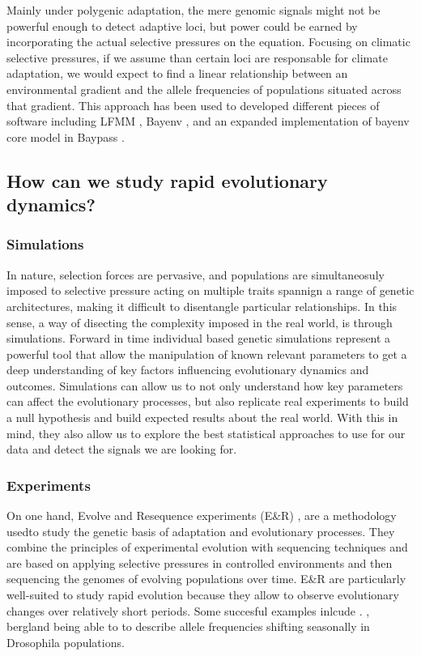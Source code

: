 \documentclass{article}
\begin{document}
Mainly under polygenic adaptation, the mere genomic signals might not be powerful enough to detect adaptive loci, but power could be earned by incorporating the actual selective pressures on the equation. Focusing on climatic selective pressures, if we assume than certain loci are responsable for climate adaptation, we would expect to find a linear relationship between an environmental gradient and the allele frequencies of populations situated across that gradient. This approach has been used to developed different pieces of software including LFMM \citep{Frichot2013-mg}, Bayenv \citep{Gunther2013-fw}, and an expanded implementation of bayenv core model in Baypass \citep{Gautier2015-lp}.

\subsection{How can we study rapid evolutionary dynamics? }
\subsubsection{Simulations}
In nature, selection forces are pervasive, and populations are simultaneosuly imposed to selective pressure acting on multiple traits spannign a range of genetic architectures, making it difficult to disentangle particular relationships. In this sense,  a way of disecting the complexity imposed in the real world, is through simulations. Forward in time individual based genetic simulations represent a powerful tool that allow the manipulation of known relevant parameters to get a deep understanding of key factors influencing evolutionary dynamics and outcomes. Simulations can allow us to not only understand how key parameters can affect the evolutionary processes, but also replicate real experiments to build a null hypothesis and build expected results about the real world.  With this in mind, they also allow us to explore the best statistical approaches to use for our data and detect the signals we are looking for. 

\subsubsection{Experiments}
On one hand, Evolve and Resequence experiments (E\&R) \citep{Schlotterer2015-yz}, are a methodology usedto study the genetic basis of adaptation and evolutionary processes. They combine the principles of experimental evolution with sequencing techniques and are based on  applying selective pressures in controlled environments and then sequencing the genomes of evolving populations over time. E\&R
are particularly well-suited to study rapid evolution because they allow to observe evolutionary changes over relatively short periods. Some succesful examples inlcude \citep{Bergland2014-ud, Kapun2021-cd, Rudman2022-uc}.  , bergland being able to to describe allele frequencies shifting seasonally in Drosophila populations. 
\end{document}
